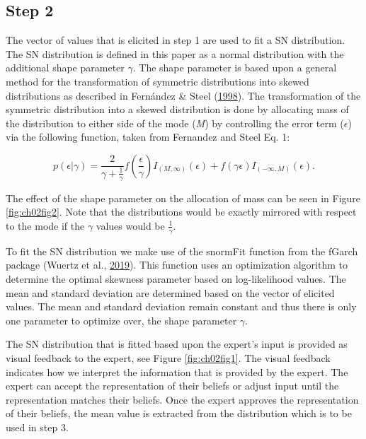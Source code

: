 \documentclass[openright,titlepage,12pt,a4paper]{book}
\begin{document}
\hypertarget{step-2}{%
\subsection{Step 2}\label{step-2}}

The vector of values that is elicited in step 1 are used to fit a SN distribution. The SN distribution is defined in this paper as a normal distribution with the additional shape parameter \(\gamma\). The shape parameter is based upon a general method for the transformation of symmetric distributions into skewed distributions as described in Fernández \& Steel (\protect\hyperlink{ref-fernandez_bayesian_1998}{1998}). The transformation of the symmetric distribution into a skewed distribution is done by allocating mass of the distribution to either side of the mode (\emph{M}) by controlling the error term (\(\epsilon\)) via the following function, taken from Fernandez and Steel Eq. 1:

\begin{equation} 
p(\epsilon|\gamma) = \frac{2}{{\gamma + \frac{1}{\gamma}}} {f(\frac{\epsilon}{\gamma})I_{(M,\infty)}(\epsilon) + f(\gamma \epsilon)I_{(-\infty,M)}(\epsilon)}.
\label{eq:ch02eq1}
\end{equation}

The effect of the shape parameter on the allocation of mass can be seen in Figure \ref{fig:ch02fig2}. Note that the distributions would be exactly mirrored with respect to the mode if the \(\gamma\) values would be \(\frac{1}{\gamma}\).

To fit the SN distribution we make use of the snormFit function from the fGarch package (Wuertz et al., \protect\hyperlink{ref-R-fGarch}{2019}). This function uses an optimization algorithm to determine the optimal skewness parameter based on log-likelihood values. The mean and standard deviation are determined based on the vector of elicited values. The mean and standard deviation remain constant and thus there is only one parameter to optimize over, the shape parameter \(\gamma\).

The SN distribution that is fitted based upon the expert's input is provided as visual feedback to the expert, see Figure \ref{fig:ch02fig1}. The visual feedback indicates how we interpret the information that is provided by the expert. The expert can accept the representation of their beliefs or adjust input until the representation matches their beliefs. Once the expert approves the representation of their beliefs, the mean value is extracted from the distribution which is to be used in step 3.
\end{document}
